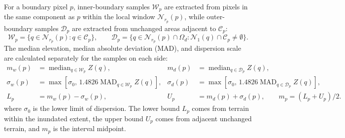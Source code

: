 \documentclass[authoryear,preprint,12pt]{elsarticle}
\begin{document}
For a boundary pixel \(p\), inner-boundary samples \(\mathcal W_p\) are extracted from pixels in the same component as \(p\) within the local window \(\mathcal N_{r_p}(p)\), while outer-boundary samples \(\mathcal D_p\) are extracted from unchanged areas adjacent to \(\mathcal C_p\):
\begin{equation}\label{eq:ccdepth_samples}
 \mathcal W_p=\{q\in\mathcal N_{r_p}(p):q\in\mathcal C_p\},\qquad
 \mathcal D_p=\{q\in\mathcal N_{r_p}(p)\cap\Omega_d:\mathcal N_1(q)\cap\mathcal C_p\neq\emptyset\}.
\end{equation}
The median elevation, median absolute deviation (MAD), and dispersion scale are calculated separately for the samples on each side:
\begin{equation}\label{eq:ccdepth_interval}
 \begin{aligned}
 m_w(p)&=\operatorname{median}_{q\in\mathcal W_p}Z(q),&
 m_d(p)&=\operatorname{median}_{q\in\mathcal D_p}Z(q),\\
 \sigma_w(p)&=\max\!\left[\sigma_0,\,1.4826\operatorname{MAD}_{q\in\mathcal W_p}Z(q)\right],&
 \sigma_d(p)&=\max\!\left[\sigma_0,\,1.4826\operatorname{MAD}_{q\in\mathcal D_p}Z(q)\right],\\
 L_p&=m_w(p)-\sigma_w(p),&
 U_p&=m_d(p)+\sigma_d(p),\qquad m_p=(L_p+U_p)/2.
 \end{aligned}
\end{equation}
where \(\sigma_0\) is the lower limit of dispersion. The lower bound \(L_p\) comes from terrain within the inundated extent, the upper bound \(U_p\) comes from adjacent unchanged terrain, and \(m_p\) is the interval midpoint.
\end{document}
